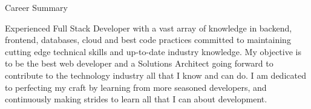 \documentclass{resume} %
\begin{document}

\begin{rSection}{Career Summary}

{\small Experienced Full Stack Developer with a vast array of knowledge in backend, frontend, databases, cloud and best code practices committed to maintaining cutting edge technical skills and up-to-date industry knowledge. My objective is to be the best web developer and a Solutions Architect going forward to contribute to the technology industry all that I know and can do. I am dedicated to perfecting my craft by learning from more seasoned developers, and continuously making strides to learn all that I can about development.}


\end{rSection}

\end{document}
